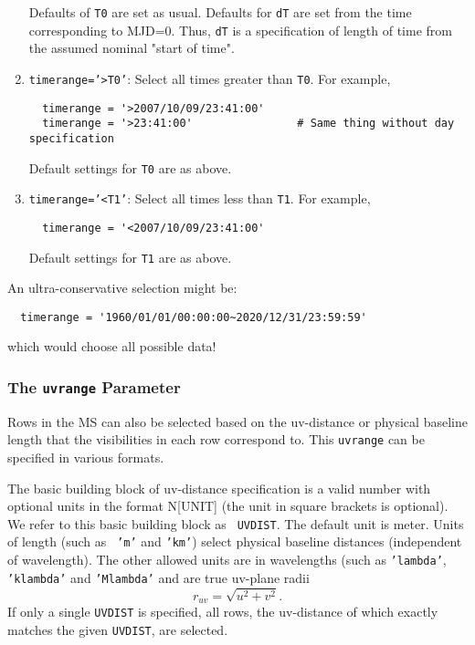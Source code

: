 \begin{enumerate}
Defaults of {\tt T0} are set as usual.  Defaults for {\tt dT} are set from the
time corresponding to MJD=0.  Thus, {\tt dT} is a specification of length of
time from the assumed nominal "start of time".

\item {\tt timerange='>T0'}: Select all times greater than {\tt T0}.
For example,
\small
\begin{verbatim}
  timerange = '>2007/10/09/23:41:00'
  timerange = '>23:41:00'                # Same thing without day specification
\end{verbatim}
\normalsize
Default settings for {\tt T0} are as above.

\item {\tt timerange='<T1'}: Select all times less than {\tt T1}.
For example,
\small
\begin{verbatim}
  timerange = '<2007/10/09/23:41:00'
\end{verbatim}
\normalsize
Default settings for {\tt T1} are as above.

\end{enumerate}

An ultra-conservative selection might be:
\small
\begin{verbatim}
  timerange = '1960/01/01/00:00:00~2020/12/31/23:59:59'
\end{verbatim}
\normalsize
which would choose all possible data!

\subsubsection{The {\tt uvrange} Parameter}
\label{section:io.selection.selectdata.uvrange}

Rows in the MS can also be selected based on the uv-distance or
physical baseline length that the visibilities in each row correspond
to.  This {\tt uvrange} can be specified in various formats.

The basic building block of uv-distance specification is a valid
number with optional units in the format N[UNIT] (the unit in square
brackets is optional).  We refer to this basic building block as {\tt
UVDIST}.  The default unit is meter.  Units of length (such as {\tt
'm'} and {\tt 'km'}) select physical baseline distances (independent
of wavelength).  The other allowed units are in wavelengths (such as
{\tt 'lambda'}, {\tt 'klambda'} and {\tt 'Mlambda'} 
and are true uv-plane radii
\begin{equation}
  r_{uv} = \sqrt{u^2+v^2}.
\end{equation}
If only a single {\tt UVDIST} is specified, all rows, the uv-distance of which
exactly matches the given {\tt UVDIST}, are selected.


